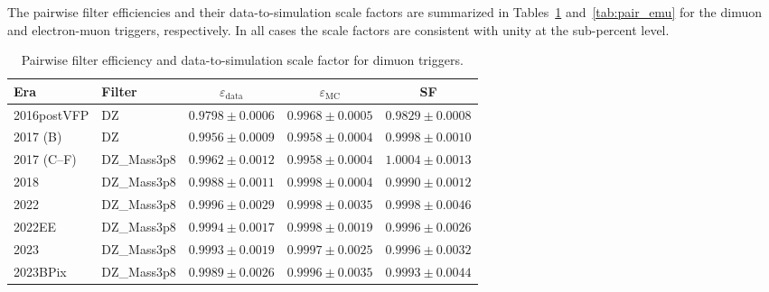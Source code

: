 The pairwise filter efficiencies and their data-to-simulation scale factors are summarized in Tables~\ref{tab:pair_dimu} and~\ref{tab:pair_emu} for the dimuon and electron-muon triggers, respectively. In all cases the scale factors are consistent with unity at the sub-percent level.

\begin{table}[htbp]
\centering
\caption{Pairwise filter efficiency and data-to-simulation scale factor for dimuon triggers.}
\label{tab:pair_dimu}
\small
\begin{tabular}{llccc}
\hline\hline
Era & Filter & $\varepsilon_\text{data}$ & $\varepsilon_\text{MC}$ & SF \\
\hline
2016postVFP & DZ            & $0.9798 \pm 0.0006$ & $0.9968 \pm 0.0005$ & $0.9829 \pm 0.0008$ \\
2017 (B)     & DZ            & $0.9956 \pm 0.0009$ & $0.9958 \pm 0.0004$ & $0.9998 \pm 0.0010$ \\
2017 (C--F)  & DZ\_Mass3p8   & $0.9962 \pm 0.0012$ & $0.9958 \pm 0.0004$ & $1.0004 \pm 0.0013$ \\
2018         & DZ\_Mass3p8   & $0.9988 \pm 0.0011$ & $0.9998 \pm 0.0004$ & $0.9990 \pm 0.0012$ \\
2022         & DZ\_Mass3p8   & $0.9996 \pm 0.0029$ & $0.9998 \pm 0.0035$ & $0.9998 \pm 0.0046$ \\
2022EE       & DZ\_Mass3p8   & $0.9994 \pm 0.0017$ & $0.9998 \pm 0.0019$ & $0.9996 \pm 0.0026$ \\
2023         & DZ\_Mass3p8   & $0.9993 \pm 0.0019$ & $0.9997 \pm 0.0025$ & $0.9996 \pm 0.0032$ \\
2023BPix     & DZ\_Mass3p8   & $0.9989 \pm 0.0026$ & $0.9996 \pm 0.0035$ & $0.9993 \pm 0.0044$ \\
\hline\hline
\end{tabular}
\end{table}

